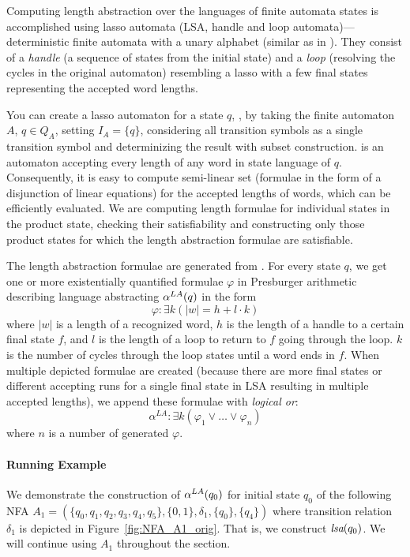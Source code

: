 Computing length abstraction over the languages of finite automata states is accomplished using lasso automata (LSA, handle and loop automata)---deterministic finite automata with a unary alphabet (similar as in \cite{10.1007/978-3-319-08867-9_10}). They consist of a \emph{handle} (a sequence of states from the initial state) and a \emph{loop} (resolving the cycles in the original automaton) resembling a lasso with a few final states representing the accepted word lengths.

You can create a lasso automaton for a state $q$, , by taking the finite automaton $A$, $q \in Q_A$, setting $ I_A = \{q\} $, considering all transition symbols as a single transition symbol and determinizing the result with subset construction.  is an automaton accepting every length of any word in state language of $q$. Consequently, it is easy to compute semi-linear set (formulae in the form of a disjunction of linear equations) for the accepted lengths of words, which can be efficiently evaluated. We are computing length formulae for individual states in the product state, checking their satisfiability and constructing only those product states for which the length abstraction formulae are satisfiable.

The length abstraction formulae are generated from . For every state $q$, we get one or more existentially quantified formulae $\varphi$ in Presburger arithmetic describing language abstracting $\alpha^{LA}(q)$ in the form
\[
    \varphi: \exists k ( |w| = h + l \cdot k )
\]
where $|w|$ is a length of a recognized word, $h$ is the length of a handle to a certain final state $f$, and $l$ is the length of a loop to return to $f$ going through the loop. $k$ is the number of cycles through the loop states until a word ends in $f$. When multiple depicted formulae are created (because there are more final states or different accepting runs for a single final state in LSA resulting in multiple accepted lengths), we append these formulae with \emph{logical or}:
\[
    \alpha^{LA} : \exists k ( \varphi_1 \lor \ldots \lor \varphi_n )
\]
where $n$ is a number of generated $\varphi$.

\paragraph{Running Example}

We demonstrate the construction of $\alpha^{LA}(q_0)$ for initial state $q_0$ of the following NFA $A_1 = (\{q_0, q_1, q_2, q_3, q_4, q_5\}, \{0, 1\}, \delta_1, \{q_0\}, \{q_4\})$ where transition relation $\delta_1$ is depicted in Figure~\ref{fig:NFA_A1_orig}. That is, we construct $\emph{lsa}(q_0)$. We will continue using $A_1$ throughout the section.

